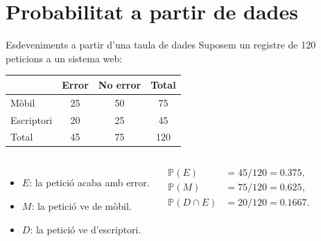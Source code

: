 \documentclass[10pt,aspectratio=169]{beamer}
\newcommand{\Prob}{\mathbb{P}}
\begin{document}
\section{Probabilitat a partir de dades}

\begin{frame}{Esdeveniments a partir d'una taula de dades}
Suposem un registre de 120 peticions a un sistema web:
\begin{center}
\small
\begin{tabular}{lccc}
\toprule
 & Error & No error & Total \\
\midrule
Mòbil & 25 & 50 & 75 \\
Escriptori & 20 & 25 & 45 \\
\midrule
Total & 45 & 75 & 120 \\
\bottomrule
\end{tabular}
\end{center}
\vspace{0.2cm}
\begin{columns}[T]
\begin{itemize}
  \item $E$: la petició acaba amb error.
  \item $M$: la petició ve de mòbil.
  \item $D$: la petició ve d'escriptori.
\end{itemize}
\begin{align*}
\Prob(E) &= 45/120 = 0.375,\\
\Prob(M) &= 75/120 = 0.625,\\
\Prob(D \cap E) &= 20/120 = 0.1667.
\end{align*}
\end{columns}
\end{frame}
\end{document}
